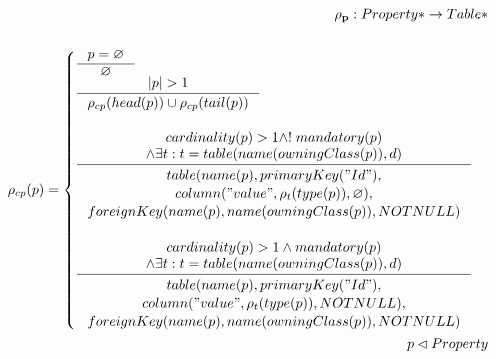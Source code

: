 \documentclass[11pt]{article}
\begin{document}
\begin{align*}
	\mathbf{\rho_p} : Property* \rightarrow Table* \\ \\
	\rho_{cp}(p) = \begin{cases}
		\inference{p = \varnothing}{\varnothing}\\
		\inference{|p| > 1}{\rho_{cp}(head(p)) \cup \rho_{cp}(tail(p))}\\\\
     	\inference{cardinality(p) > 1 \wedge !\;mandatory(p) \\ 
     		\wedge 	\exists t : t = table(name(owningClass(p)), d)
     		}{\begin{gathered}
     			table(name(p), primaryKey("Id"), \\ column("value", 			\rho_t(type(p)), \varnothing), \\ foreignKey(name(p), 			name(owningClass(p)), NOTNULL) \\
    	\end{gathered}}\\ \\
     	\inference{ cardinality(p) > 1 \wedge mandatory(p) \\ 
     		\wedge \exists t : t = table(name(owningClass(p)), d) 
     		}{\begin{gathered}  
     			table(name(p), primaryKey("Id"), \\ 
     			column("value", \rho_t(type(p)), NOTNULL), \\ 			foreignKey(name(p), name(owningClass(p)), NOTNULL)
    	 \end{gathered}}
 	\end{cases}\\
 	p \lhd Property
\end{align*}
\end{document}
